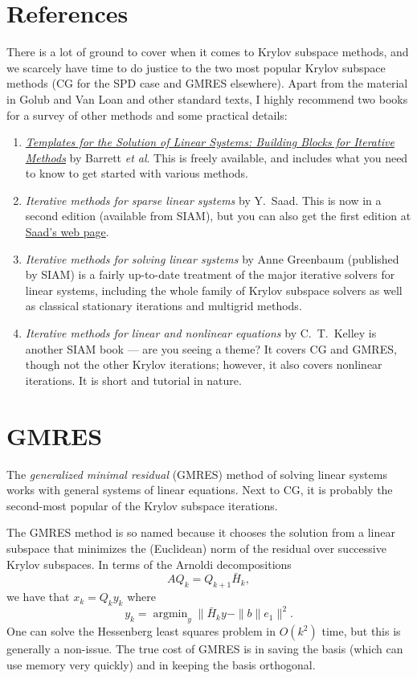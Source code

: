 \documentclass[12pt, leqno]{article} %
\begin{document}

\section{References}

There is a lot of ground to cover when it comes to Krylov subspace
methods, and we scarcely have time to do justice to the two most popular
Krylov subspace methods (CG for the SPD case and GMRES elsewhere).
Apart from the material in Golub and Van Loan and other standard texts,
I highly recommend two books for a survey of other methods and some
practical details:
\begin{enumerate}
\item \href{http://www.netlib.org/templates/templates.pdf}{\em Templates for the Solution of Linear Systems:
Building Blocks for Iterative Methods}
  by Barrett {\em et al}.  This is freely available, and includes
  what you need to know to get started with various methods.
\item {\em Iterative methods for sparse linear systems} by Y.~Saad.
  This is now in a second edition (available from SIAM), but you
  can also get the first edition at \href{http://www-users.cs.umn.edu/~saad/books.html}{Saad's web page}.
\item {\em Iterative methods for solving linear systems} by Anne Greenbaum
  (published by SIAM) is a fairly up-to-date treatment of the major iterative
  solvers for linear systems, including the whole family of Krylov subspace
  solvers as well as classical stationary iterations and multigrid methods.
\item {\em Iterative methods for linear and nonlinear equations} by C.~T.~Kelley
  is another SIAM book --- are you seeing a theme?
  It covers CG and GMRES, though not the other
  Krylov iterations; however, it also covers nonlinear iterations.  It is
  short and tutorial in nature.
\end{enumerate}

\section{GMRES}

The {\em generalized minimal residual} (GMRES) method of solving
linear systems works with general systems of linear equations.
Next to CG, it is probably the second-most popular of the Krylov
subspace iterations.

The GMRES method is so named because it chooses the solution from a
linear subspace that minimizes the (Euclidean) norm of the residual
over successive Krylov subspaces.  In terms of the Arnoldi
decompositions
\[
  AQ_k = Q_{k+1} \bar{H}_k,
\]
we have that $x_k = Q_k y_k$ where
\[
  y_k = \operatorname{argmin}_y \|\bar{H}_k y - \|b\| e_1\|^2.
\]
One can solve the Hessenberg least squares problem in $O(k^2)$
time, but this is generally a non-issue.  The true cost of GMRES
is in saving the basis (which can use memory very quickly) and in
keeping the basis orthogonal.
\end{document}
